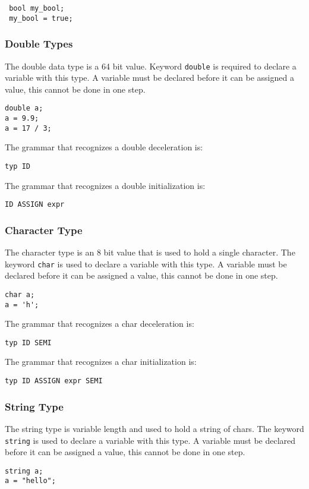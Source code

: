 \documentclass{article}
\begin{document}
\begin{lstlisting}
 bool my_bool;
 my_bool = true;
\end{lstlisting}

\subsubsection{Double Types}
The double data type is a 64 bit value.  Keyword \texttt{double} is required to declare a variable with this type.  A variable must be declared before it can be assigned a value, this cannot be done in one step.

\begin{lstlisting}
double a;
a = 9.9;
a = 17 / 3;
\end{lstlisting}

The grammar that recognizes a double deceleration is: 
\begin{Verbatim}[frame=single]
typ ID
\end{Verbatim}

The grammar that recognizes a double initialization is: 
\begin{Verbatim}[frame=single]
ID ASSIGN expr
\end{Verbatim}

\subsubsection{Character Type}
The character type is an 8 bit value that is used to hold a single character. The keyword \texttt{char} is used to declare a variable with this type.  A variable must be declared before it can be assigned a value, this cannot be done in one step.
\begin{lstlisting}
char a;
a = 'h';
\end{lstlisting}

The grammar that recognizes a char deceleration is: 
\begin{Verbatim}[frame=single]
typ ID SEMI
\end{Verbatim}

The grammar that recognizes a char initialization is: 
\begin{Verbatim}[frame=single]
typ ID ASSIGN expr SEMI
\end{Verbatim}

\subsubsection{String Type}
The string type is variable length and used to hold a string of chars.  The keyword \texttt{string} is used to declare a variable with this type.  A variable must be declared before it can be assigned a value, this cannot be done in one step.
\begin{lstlisting}
string a;
a = "hello";
\end{lstlisting}
\end{document}
